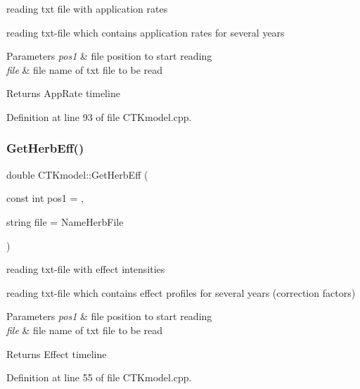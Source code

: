 reading txt file with application rates 

reading txt-\/file which contains application rates for several years 
\begin{DoxyParams}{Parameters}
{\em pos1} & file position to start reading \\
\hline
{\em file} & file name of txt file to be read \\
\hline
\end{DoxyParams}
\begin{DoxyReturn}{Returns}
App\+Rate timeline 
\end{DoxyReturn}


Definition at line 93 of file C\+T\+Kmodel.\+cpp.

\mbox{\label{class_c_t_kmodel_a4bfc81ccf5bc7355642eb526b4375fb5}} 
\subsubsection{\texorpdfstring{GetHerbEff()}{GetHerbEff()}}
{\footnotesize\ttfamily double C\+T\+Kmodel\+::\+Get\+Herb\+Eff (\begin{DoxyParamCaption}\item[{const int}]{pos1 = {},  }\item[{string}]{file = {\ttfamily NameHerbFile} }\end{DoxyParamCaption})\hspace{0.3cm}{\ttfamily [static]}}



reading txt-\/file with effect intensities 

reading txt-\/file which contains effect profiles for several years (correction factors) 
\begin{DoxyParams}{Parameters}
{\em pos1} & file position to start reading \\
\hline
{\em file} & file name of txt file to be read \\
\hline
\end{DoxyParams}
\begin{DoxyReturn}{Returns}
Effect timeline 
\end{DoxyReturn}


Definition at line 55 of file C\+T\+Kmodel.\+cpp.

\mbox{\label{class_c_t_kmodel_a1840a4b16c95c07995f55e317c23497e}} 
